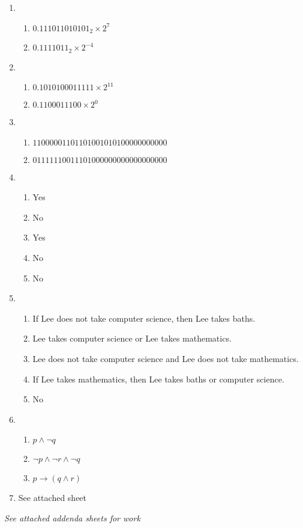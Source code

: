 \begin{enumerate}[leftmargin=2cm,labelsep=.5cm,label=\bf\arabic*.]
\item
\begin{enumerate}
  \item $0.111011010101_2 \times 2^7$
  \item $0.1111011_2 \times 2^{-4}$\\[5mm]
\end{enumerate}

\item
\begin{enumerate}
  \item $0.1010100011111 \times 2^{11}$
  \item $0.1100011100 \times 2^0$\\[5mm]
\end{enumerate}

\item
\begin{enumerate}
  \item $11000001 10110100 10101000 00000000$
  \item $01111110 01110100 00000000 00000000$\\[5mm]
\end{enumerate}

\item 
\begin{enumerate}
  \item Yes
  \item No
  \item Yes
  \item No
  \item No\\[5mm]
\end{enumerate}

\item
  	\begin{enumerate}
  \item If Lee does not take computer science, then Lee takes baths.
  \item Lee takes computer science or Lee takes mathematics.
  \item Lee does not take computer science and Lee does not take mathematics.
  \item If Lee takes mathematics, then Lee takes baths or computer science.
  \item No\\[5mm]
\end{enumerate}

\item
  	\begin{enumerate}
  \item $p \wedge\neg q$
  \item $\neg p\wedge\neg r\wedge\neg q$
  \item $p\rightarrow (q\wedge r)$\\[5mm]
\end{enumerate}

\item See attached sheet    
\end{enumerate}
\centering\textit{See attached addenda sheets for work}